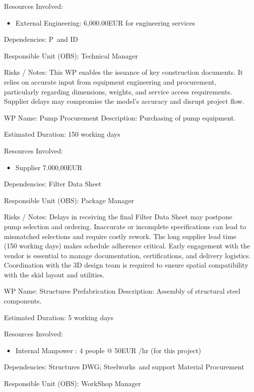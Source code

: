 Resources Involved:
\begin{itemize}
    \item External Engineering: 6,000.00EUR  for engineering services
\end{itemize}

Dependencies:
P\ and ID

Responsible Unit (OBS): Technical Manager

Risks / Notes:
This WP enables the issuance of key construction documents. It relies on accurate input from equipment engineering and procurement, particularly regarding dimensions, weights, and service access requirements. Supplier delays may compromise the model’s accuracy and disrupt project flow.

WP Name: Pump Procurement
Description:
Purchasing of pump equipment.

Estimated Duration: 150 working days

Resources Involved:
\begin{itemize}
    \item  Supplier 7.000,00EUR 
\end{itemize}

Dependencies:
Filter Data Sheet

Responsible Unit (OBS): Package Manager

Risks / Notes:
Delays in receiving the final Filter Data Sheet may postpone pump selection and ordering.
Inaccurate or incomplete specifications can lead to mismatched selections and require costly rework.
The long supplier lead time (150 working days) makes schedule adherence critical.
Early engagement with the vendor is essential to manage documentation, certifications, and delivery logistics.
Coordination with the 3D design team is required to ensure spatial compatibility with the skid layout and utilities.

WP Name: Structures Prefabrication
Description:
Assembly of structural steel components.

Estimated Duration: 5 working days

Resources Involved:
\begin{itemize}
    \item  Internal Manpower : 4 people @ 50EUR /hr (for this project)
\end{itemize}

Dependencies:
Structures DWG; Steelworks\ and support Material Procurement

Responsible Unit (OBS): WorkShop Manager

